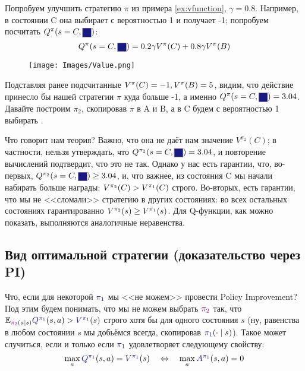 \begin{example}
Попробуем улучшить стратегию $\pi$ из примера \ref{ex:vfunction}, $\gamma = 0.8$. Например, в состоянии C она выбирает  с вероятностью 1 и получает -1; попробуем посчитать $Q^{\pi}(s \HM= C, \colorsquare{ChadBlue})$:
$$
Q^{\pi}(s = C, \colorsquare{ChadBlue}) = 0.2\gamma V^{\pi}(C) + 0.8 \gamma V^{\pi}(B)
$$
\begin{wrapfigure}{r}{0.45\textwidth}
\vspace{-0.8cm}
\centering
\texttt{[image: Images/Value.png]}
\end{wrapfigure}
Подставляя ранее подсчитанные $V^{\pi}(C) \HM= -1, V^{\pi}(B) \HM= 5$, видим, что действие  принесло бы нашей стратегии $\pi$ куда больше -1, а именно $Q^{\pi}(s = C, \colorsquare{ChadBlue}) \HM= 3.04$. Давайте построим $\pi_2$, скопировав $\pi$ в A и B, а в C будем с вероятностью 1 выбирать .

Что говорит нам теория? Важно, что она не даёт нам значение $V^{\pi_2}(C)$; в частности, нельзя утверждать, что $Q^{\pi_2}(s = C, \colorsquare{ChadBlue}) \HM= 3.04$, и повторение вычислений подтвердит, что это не так. Однако у нас есть гарантии, что, во-первых, $Q^{\pi_2}(s = C, \colorsquare{ChadBlue}) \ge 3.04$, и, что важнее, из состояния C мы начали набирать больше награды: $V^{\pi_2}(C) \HM> V^{\pi_1}(C)$ строго. Во-вторых, есть гарантии, что мы не <<сломали>> стратегию в других состояниях: во всех остальных состояниях гарантированно $V^{\pi_2}(s) \HM\ge V^{\pi_1}(s)$. Для Q-функции, как можно показать, выполняются аналогичные неравенства.
\end{example}

\subsection{Вид оптимальной стратегии (доказательство через PI)}

Что, если для некоторой $\textcolor{ChadBlue}{\pi_1}$ мы <<не можем>> провести Policy Improvement? Под этим будем понимать, что мы не можем выбрать $\textcolor{ChadPurple}{\pi_{2}}$ так, что $\E_{\textcolor{ChadPurple}{\pi_{2}}(a \mid s)} \textcolor{ChadBlue}{Q^{\pi_{1}}}(s, a) \HM> \textcolor{ChadBlue}{V^{\pi_{1}}}(s)$ строго хотя бы для одного состояния $s$ (ну, равенства в любом состоянии $s$ мы добьёмся всегда, скопировав $\textcolor{ChadBlue}{\pi_1}(\cdot \HM\mid s)$). Такое может случиться, если и только если $\textcolor{ChadBlue}{\pi_1}$ удовлетворяет следующему свойству:
$$\max_a \textcolor{ChadBlue}{Q^{\pi_{1}}}(s, a) = \textcolor{ChadBlue}{V^{\pi_{1}}}(s) \quad \Leftrightarrow \quad \max\limits_a \textcolor{ChadBlue}{A^{\pi_1}}(s, a) = 0$$

